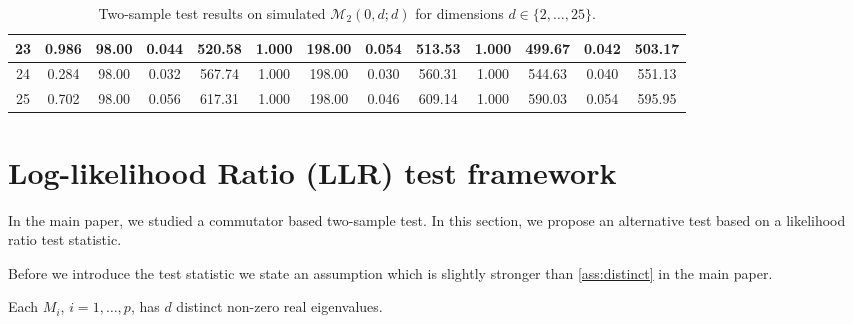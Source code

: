 \documentclass[12pt]{article}
\numberwithin{equation}{section}
\numberwithin{table}{section}
\numberwithin{thm}{section}
\numberwithin{defn}{section}
\numberwithin{lem}{section}
\numberwithin{prop}{section}
\numberwithin{cor}{section}
\numberwithin{rem}{section}
\newenvironment{ass*}
 {\expandafter\def\expandafter\theass\expandafter{\theass*}\ass}
 {\endass}
\begin{document}
\begin{appendix}
\begin{sidewaystable}[htbp]
\begin{tabular}{|c|cccc|cccc|cccc|}
23 & \multicolumn{1}{c|}{0.986} & \multicolumn{1}{c|}{98.00} & \multicolumn{1}{c|}{0.044} & 520.58 & \multicolumn{1}{c|}{1.000} & \multicolumn{1}{c|}{198.00} & \multicolumn{1}{c|}{0.054} & 513.53 & \multicolumn{1}{c|}{1.000} & \multicolumn{1}{c|}{499.67} & \multicolumn{1}{c|}{0.042} & 503.17 \\ \hline
24 & \multicolumn{1}{c|}{0.284} & \multicolumn{1}{c|}{98.00} & \multicolumn{1}{c|}{0.032} & 567.74 & \multicolumn{1}{c|}{1.000} & \multicolumn{1}{c|}{198.00} & \multicolumn{1}{c|}{0.030} & 560.31 & \multicolumn{1}{c|}{1.000} & \multicolumn{1}{c|}{544.63} & \multicolumn{1}{c|}{0.040} & 551.13 \\ \hline
25 & \multicolumn{1}{c|}{0.702} & \multicolumn{1}{c|}{98.00} & \multicolumn{1}{c|}{0.056} & 617.31 & \multicolumn{1}{c|}{1.000} & \multicolumn{1}{c|}{198.00} & \multicolumn{1}{c|}{0.046} & 609.14 & \multicolumn{1}{c|}{1.000} & \multicolumn{1}{c|}{590.03} & \multicolumn{1}{c|}{0.054} & 595.95 \\ \hline
\end{tabular}
\caption{Two-sample test results on simulated $\mathcal{M}_2(0, d; d)$ for dimensions $d \in \{ 2, \dots, 25 \}$.} \label{ta:differentdimensions}
\label{ta:highd}
\end{sidewaystable}

\section{Log-likelihood Ratio (LLR) test framework}
\label{sec:llrt}

In the main paper, we studied a commutator based two-sample test. In this section, we propose an alternative test based on a likelihood ratio test statistic.

Before we introduce the test statistic we state an assumption which is slightly stronger than \autoref{ass:distinct} in the main paper.

\setcounter{ass}{2}
\begin{ass*}\label{ass:distinct2}
Each $M_i$, $i=1,\dots,p$, has $d$ distinct non-zero real eigenvalues.
\end{ass*}






\end{appendix}
\end{document}
